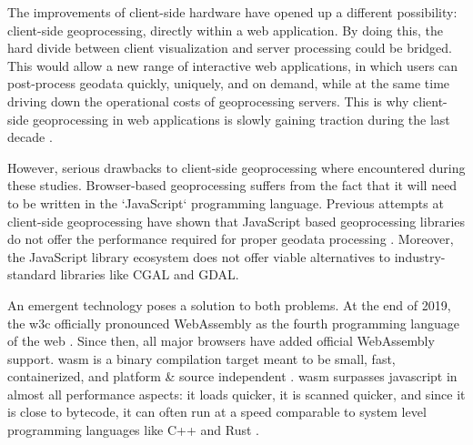 The improvements of client-side hardware have opened up a different possibility: client-side geoprocessing, directly within a web application. By doing this, the hard divide between client visualization and server processing could be bridged. This would allow a new range of interactive web applications, in which users can post-process geodata quickly, uniquely, and on demand, while at the same time driving down the operational costs of geoprocessing servers. This is why client-side \ac{geoprocessing} in web applications is slowly gaining traction during the last decade \cite{kulawiak_analysis_2019, panidi_hybrid_2015, hamilton_client-side_2014}. 


However, serious drawbacks to client-side geoprocessing where encountered during these studies.  
Browser-based geoprocessing suffers from the fact that it will need to be written in the `JavaScript` programming language. 
Previous attempts at client-side geoprocessing have shown that JavaScript based geoprocessing libraries do not offer the performance required for proper geodata processing \cite{hamilton_client-side_2014}. 
Moreover, the JavaScript library ecosystem does not offer viable alternatives to industry-standard libraries like CGAL and GDAL. 

An emergent technology poses a solution to both problems. At the end of 2019, the \ac{w3c} officially pronounced WebAssembly as the fourth programming language of the web \cite{w3c_world_2019}. Since then, all major browsers have added official WebAssembly support. \ac{wasm} is a binary compilation target meant to be small, fast, containerized, and platform \& source independent \cite{haas_bringing_2017}. \ac{wasm} surpasses javascript in almost all performance aspects: it loads quicker, it is scanned quicker, and since it is close to bytecode, it can often run at a speed comparable to system level programming languages like C++ and Rust \cite{jangda_not_2019}. 

